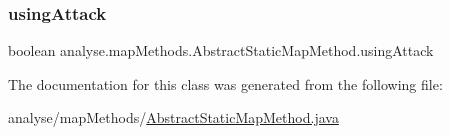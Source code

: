 \subsubsection{\texorpdfstring{using\+Attack}{usingAttack}}
{\footnotesize\ttfamily boolean analyse.\+map\+Methods.\+Abstract\+Static\+Map\+Method.\+using\+Attack\hspace{0.3cm}{\ttfamily [private]}}



The documentation for this class was generated from the following file\+:\begin{DoxyCompactItemize}
\item 
analyse/map\+Methods/\mbox{\hyperlink{_abstract_static_map_method_8java}{Abstract\+Static\+Map\+Method.\+java}}\end{DoxyCompactItemize}
